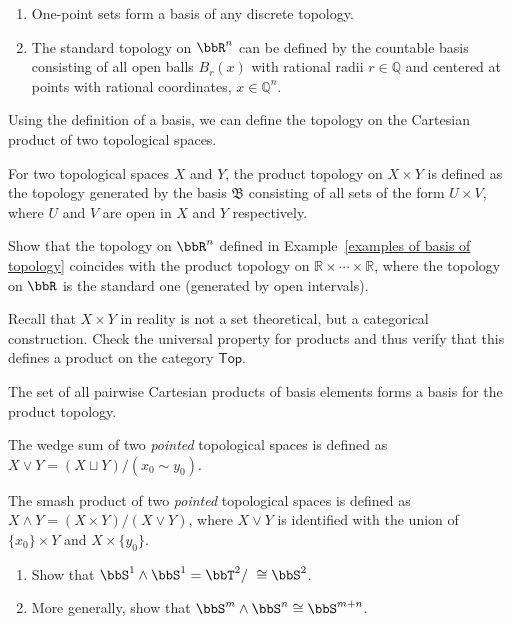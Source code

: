 \begin{example}\label{examples of basis of topology}
\begin{enumerate}
    \item One-point sets form a basis of any discrete topology.
    \item The standard topology on $\bbR^n$ can be defined by the countable basis consisting of all open balls $B_{r}(x)$ with rational radii $r\in\mathbb{Q}$ and centered at points with rational coordinates, $x\in\mathbb{Q}^n$.
\end{enumerate}
\end{example}

Using the definition of a basis, we can define the topology on the Cartesian product of two topological spaces.

\begin{defn}
    For two topological spaces $X$ and $Y$, the product topology on $X\times Y$ is defined as the topology generated by the basis $\mathfrak{B}$ consisting of all sets of the form $U\times V$, where $U$ and $V$ are open in $X$ and $Y$ respectively.
\end{defn}

\begin{xca}
    Show that the topology on $\bbR^n$ defined in Example~\ref{examples of basis of topology} coincides with the product topology on $\mathbb R\times \cdots \times \mathbb R$, where the topology on $\bbR $ is the standard one (generated by open intervals).
\end{xca}
\begin{xca}
    Recall that $X\times Y$ in reality is not a set theoretical, but a categorical construction. Check the universal property for products and thus verify that this defines a product on the category $\mathsf{Top}$.
\end{xca}

\begin{rem}
    The set of all pairwise Cartesian products of basis elements forms a basis for the product topology.
\end{rem}

\begin{defn}
    The wedge sum of two \emph{pointed} topological spaces is defined as $X\vee Y=(X\sqcup Y)/(x_0\sim y_0)$.
\end{defn}
\begin{defn}
    The smash product of two \emph{pointed} topological spaces is defined as $X\wedge Y=(X\times Y)/(X\vee Y)$, where $X\vee Y$ is identified with the union of $\{x_0\}\times Y$ and $X\times \{y_0\}$.
\end{defn}
\begin{xca}\label{wedge sums}
    \begin{enumerate}
        \item Show that $\bbS^1\wedge \bbS^1=\bbT^2/~\cong \bbS^2$.
        \item More generally, show that $\bbS^m\wedge \bbS^n\cong \bbS^{m+n}$.
    \end{enumerate}
\end{xca}


